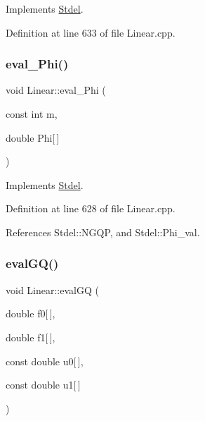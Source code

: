 Implements \hyperlink{classStdel_a83a7a53e4be6da7c3a615967e4504b07}{Stdel}.



Definition at line 633 of file Linear.\+cpp.

\mbox{\label{classLinear_a46fd7278a34a6b665e7ab469a244ce1e}} 
\subsubsection{\texorpdfstring{eval\+\_\+\+Phi()}{eval\_Phi()}}
{\footnotesize\ttfamily void Linear\+::eval\+\_\+\+Phi (\begin{DoxyParamCaption}\item[{const int}]{m,  }\item[{double}]{Phi\mbox{[}$\,$\mbox{]} }\end{DoxyParamCaption})\hspace{0.3cm}{\ttfamily [virtual]}}



Implements \hyperlink{classStdel_a2aa6ea12ceaa1fa4a7f63909ce41bc0b}{Stdel}.



Definition at line 628 of file Linear.\+cpp.



References Stdel\+::\+N\+G\+QP, and Stdel\+::\+Phi\+\_\+val.

\mbox{\label{classLinear_af9e2cd53ea3067ab074a735ef7df33e7}} 
\subsubsection{\texorpdfstring{eval\+G\+Q()}{evalGQ()}\hspace{0.1cm}{\footnotesize\ttfamily [1/2]}}
{\footnotesize\ttfamily void Linear\+::eval\+GQ (\begin{DoxyParamCaption}\item[{double}]{f0\mbox{[}$\,$\mbox{]},  }\item[{double}]{f1\mbox{[}$\,$\mbox{]},  }\item[{const double}]{u0\mbox{[}$\,$\mbox{]},  }\item[{const double}]{u1\mbox{[}$\,$\mbox{]} }\end{DoxyParamCaption})\hspace{0.3cm}{\ttfamily [virtual]}}



